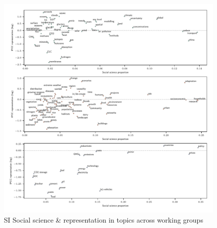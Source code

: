 \documentclass{article}
\begin{document}
\begin{linenumbers}
\begin{figure}
	\begin{center}
		\includegraphics[width=1\linewidth]{plots_pub/wgs_socsci.pdf}
		\caption{SI Social science \& representation in topics across working groups}
		\label{socsci-wgs}
	\end{center}
\end{figure}
	
		
	\end{linenumbers}

\linespread{1}


\end{document}
